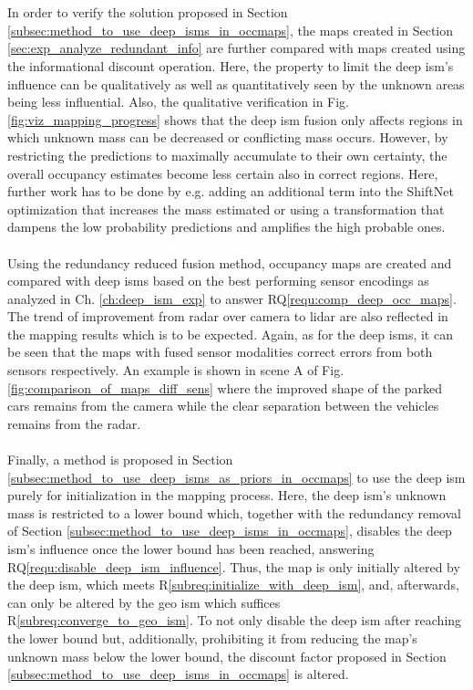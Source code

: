 \\\\
In order to verify the solution proposed in Section \ref{subsec:method_to_use_deep_isms_in_occmaps}, the maps created in Section \ref{sec:exp_analyze_redundant_info} are further compared with maps created using the informational discount operation. Here, the property to limit the deep \gls{ism}'s influence can be qualitatively as well as quantitatively seen by the unknown areas being less influential. Also, the qualitative verification in Fig. \ref{fig:viz_mapping_progress} shows that the deep \gls{ism} fusion only affects regions in which unknown mass can be decreased or conflicting mass occurs. However, by restricting the predictions to maximally accumulate to their own certainty, the overall occupancy estimates become less certain also in correct regions. Here, further work has to be done by e.g. adding an additional term into the ShiftNet optimization that increases the mass estimated or using a transformation that dampens the low probability predictions and amplifies the high probable ones.
\\\\
Using the redundancy reduced fusion method, occupancy maps are created and compared with deep \gls{ism}s based on the best performing sensor encodings as analyzed in Ch. \ref{ch:deep_ism_exp} to answer RQ\ref{requ:comp_deep_occ_maps}. The trend of improvement from radar over camera to lidar are also reflected in the mapping results which is to be expected. Again, as for the deep \gls{ism}s, it can be seen that the maps with fused sensor modalities correct errors from both sensors respectively. An example is shown in scene A of Fig. \ref{fig:comparison_of_maps_diff_sens} where the improved shape of the parked cars remains from the camera while the clear separation between the vehicles remains from the radar.
\\\\
Finally, a method is proposed in Section \ref{subsec:method_to_use_deep_isms_as_priors_in_occmaps} to use the deep \gls{ism} purely for initialization in the mapping process. Here, the deep \gls{ism}'s unknown mass is restricted to a lower bound which, together with the redundancy removal of Section \ref{subsec:method_to_use_deep_isms_in_occmaps}, disables the deep \gls{ism}'s influence once the lower bound has been reached, answering RQ\ref{requ:disable_deep_ism_influence}. Thus, the map is only initially altered by the deep \gls{ism}, which meets R\ref{subreq:initialize_with_deep_ism}, and, afterwards, can only be altered by the geo \gls{ism} which suffices R\ref{subreq:converge_to_geo_ism}. To not only disable the deep \gls{ism} after reaching the lower bound but, additionally, prohibiting it from reducing the map's unknown mass below the lower bound, the discount factor proposed in Section \ref{subsec:method_to_use_deep_isms_in_occmaps} is altered.
